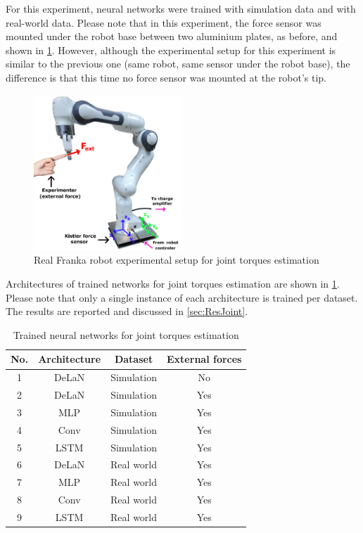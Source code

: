 For this experiment, neural networks were trained with simulation data and with real-world data. Please note that in this experiment, the force sensor was mounted under the robot base between two aluminium plates, as before, and shown in \cref{fig:FrankaTorqueSetup}. However, although the experimental setup for this experiment is similar to the previous one (same robot, same sensor under the robot base), the difference is that this time no force sensor was mounted at the robot's tip.

\begin{figure}
    \centering
    \includegraphics[width=0.5\textwidth]{slike/Fig03_26.png}
    \caption{Real Franka robot experimental setup for joint torques estimation}
    \label{fig:FrankaTorqueSetup}
\end{figure}

Architectures of trained networks for joint torques estimation are shown in \cref{tab:NetworksFrankaTorque}. Please note that only a single instance of each architecture is trained per dataset. The results are reported and discussed in \cref{sec:ResJoint}.

\begin{table}
    \centering
    \caption{Trained neural networks for joint torques estimation}
    \label{tab:NetworksFrankaTorque}
    \begin{tabular}{cccc}
        \toprule
        \textbf{No.} & \textbf{Architecture} & \textbf{Dataset} & \textbf{External forces} \\
        \midrule
        1 & DeLaN & Simulation & No \\ %
        2 & DeLaN & Simulation & Yes \\ %
        3 & MLP & Simulation & Yes \\ %
        4 & Conv & Simulation & Yes\\ %
        5 & LSTM & Simulation & Yes \\ %
        \midrule
        6 & DeLaN & Real world & Yes \\ %
        7 & MLP & Real world & Yes\\%
        8 & Conv & Real world & Yes\\ %
        9 & LSTM & Real world & Yes\\ %
        \bottomrule
    \end{tabular}
\end{table}

